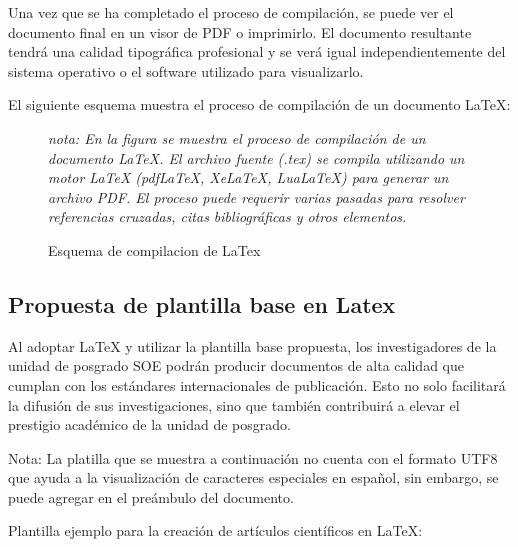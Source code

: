 \documentclass[10pt,twocolumn]{article}
\begin{document}
    Una vez que se ha completado el proceso de compilación, se puede ver el documento final en un visor de PDF o imprimirlo. El documento resultante tendrá una calidad tipográfica profesional y se verá igual independientemente del sistema operativo o el software utilizado para visualizarlo.


    El siguiente esquema muestra el proceso de compilación de un documento LaTeX:
    \begin{figure}[!ht]
    \caption{Esquema de compilacion de LaTex}
        \centering
        \label{fig:LatexD}
    \textit{nota: En la figura se muestra el proceso de compilación de un documento LaTeX. El archivo fuente (.tex) se compila utilizando un motor LaTeX (pdfLaTeX, XeLaTeX, LuaLaTeX) para generar un archivo PDF. El proceso puede requerir varias pasadas para resolver referencias cruzadas, citas bibliográficas y otros elementos.}
    \end{figure} 
    
    \subsection{Propuesta de plantilla base en Latex}
    Al adoptar LaTeX y utilizar la plantilla base propuesta, los investigadores de la unidad de posgrado SOE podrán producir documentos de alta calidad que cumplan con los estándares internacionales de publicación. 
    Esto no solo facilitará la difusión de sus investigaciones, sino que también contribuirá a elevar el prestigio académico de la unidad de posgrado.

    Nota: La platilla que se muestra a continuación no cuenta con el formato UTF8 que ayuda a la visualización de caracteres especiales en español, sin embargo, se puede agregar en el preámbulo del documento.

    Plantilla ejemplo para la creación de artículos científicos en LaTeX:
\end{document}
